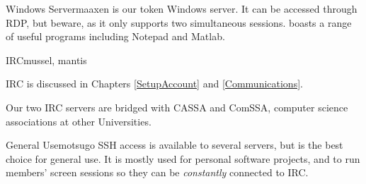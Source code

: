 \begin{uccservice}{Windows Server}{maaxen}
 is our token Windows server. It can be accessed through RDP, but beware, as it only supports two simultaneous sessions.  boasts a range of useful programs including Notepad and Matlab.

\end{uccservice}
\begin{uccservice}{IRC}{mussel, mantis}

IRC is discussed in Chapters \ref{SetupAccount} and \ref{Communications}.

Our two IRC servers are bridged with CASSA and ComSSA, computer science associations at other Universities.
\end{uccservice}

\begin{uccservice}{General Use}{motsugo}
SSH access is available to several servers, but  is the best choice for general use. It is mostly used for personal software projects, and to run members' screen sessions so they can be \emph{constantly} connected to IRC.
\end{uccservice}